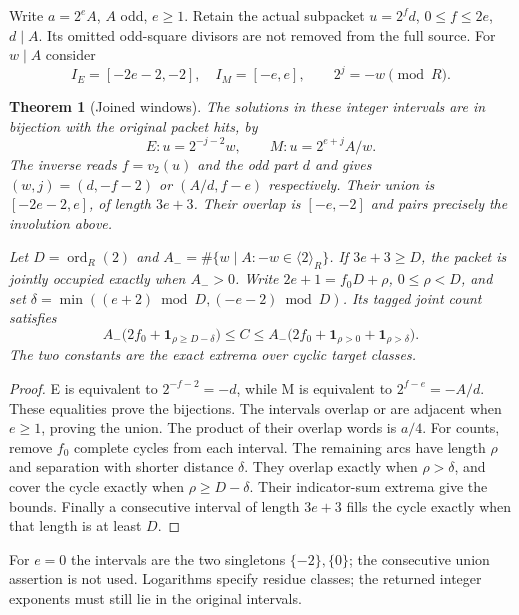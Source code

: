 \documentclass[11pt,reqno]{amsart}
\newtheorem{theorem}{Theorem}\newtheorem{proposition}[theorem]{Proposition}
\begin{document}
Write $a=2^eA$, $A$ odd, $e\ge1$. Retain the actual subpacket
$u=2^fd$, $0\le f\le2e$, $d\mid A$. Its omitted odd-square divisors are not
removed from the full source. For $w\mid A$ consider
\[
 I_E=[-2e-2,-2],\quad I_M=[-e,e],\qquad 2^j=-w\pmod R.
\]
\begin{theorem}[Joined windows]
The solutions in these integer intervals are in bijection with the original
packet hits, by
\[
 E:u=2^{-j-2}w,\qquad M:u=2^{e+j}A/w.
\]
The inverse reads $f=v_2(u)$ and the odd part $d$ and gives
$(w,j)=(d,-f-2)$ or $(A/d,f-e)$ respectively. Their union is
$[-2e-2,e]$, of length $3e+3$. Their overlap is $[-e,-2]$ and pairs
precisely the involution above.

Let $D=\operatorname{ord}_R(2)$ and $A_- =\#\{w\mid A:-w\in\langle2\rangle_R\}$.
If $3e+3\ge D$, the packet is jointly occupied exactly when $A_->0$.
Write $2e+1=f_0D+\rho$, $0\le\rho<D$, and set
$\delta=\min((e+2)\bmod D,(-e-2)\bmod D)$. Its tagged joint count satisfies
\[
 A_-\bigl(2f_0+\mathbf1_{\rho\ge D-\delta}\bigr)
 \le C\le A_-\bigl(2f_0+\mathbf1_{\rho>0}+\mathbf1_{\rho>\delta}\bigr).
\]
The two constants are the exact extrema over cyclic target classes.
\end{theorem}
\begin{proof}
E is equivalent to $2^{-f-2}=-d$, while M is equivalent to $2^{f-e}=-A/d$.
These equalities prove the bijections. The intervals overlap or are adjacent
when $e\ge1$, proving the union. The product of their overlap words is $a/4$.
For counts, remove $f_0$ complete cycles from each interval. The remaining arcs
have length $\rho$ and separation with shorter distance $\delta$. They overlap
exactly when $\rho>\delta$, and cover the cycle exactly when $\rho\ge D-\delta$.
Their indicator-sum extrema give the bounds. Finally a consecutive interval of
length $3e+3$ fills the cycle exactly when that length is at least $D$.
\end{proof}
For $e=0$ the intervals are the two singletons $\{-2\},\{0\}$; the consecutive
union assertion is not used. Logarithms specify residue classes; the returned
integer exponents must still lie in the original intervals.
\end{document}
